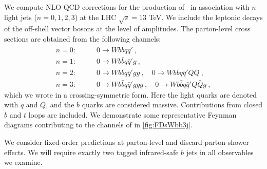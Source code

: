 We compute NLO QCD corrections for the production of \Wbb~in association with $n$ light jets ($n =
0,1,2,3$) at the LHC $\sqrt{s} = 13$ TeV. 
We include the leptonic decays of the off-shell vector bosons at the level of amplitudes.
The parton-level cross sections are obtained from the following channels:
\begin{subequations}
  \begin{align}
    n=0:&\qquad 0\rightarrow Wb{\bar b}q{\bar q}'\ ,\\
    n=1:&\qquad 0\rightarrow Wb{\bar b}q{\bar q}'g\ ,\\
    n=2:&\qquad 0\rightarrow Wb{\bar b}q{\bar q}'gg\ ,\quad  0\rightarrow Wb{\bar b}q{\bar q}'Q{\bar Q}\ ,\\
    n=3:&\qquad 0\rightarrow Wb{\bar b}q{\bar q}'ggg\ ,\quad  0\rightarrow Wb{\bar b}q{\bar q}'Q{\bar Q}g\ ,
  \end{align}
\end{subequations}
which we wrote in a crossing-symmetric form. 
Here the light quarks are denoted with $q$ and $Q$, and the $b$ quarks are considered massive.
Contributions from closed $b$ and $t$ loops are included. 
We demonstrate some representative Feynman diagrams contributing to the channels of \Wbbjjj{} in \cref{fig:FDsWbb3j}.

We consider fixed-order predictions at parton-level and discard parton-shower
effects. We will require exactly two tagged infrared-safe $b$ jets \cite{Banfi:2006hf}
in all observables we examine.

